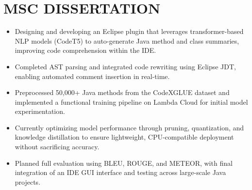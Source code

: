 \section{MSC DISSERTATION}
{
  {\begin{itemize}
    \item Designing and developing an Eclipse plugin that leverages transformer-based NLP models (CodeT5) to auto-generate Java method and class summaries, improving code comprehension within the IDE.
    \item Completed AST parsing and integrated code rewriting using Eclipse JDT, enabling automated comment insertion in real-time.
    \item Preprocessed 50,000+ Java methods from the CodeXGLUE dataset and implemented a functional training pipeline on Lambda Cloud for initial model experimentation.
    \item Currently optimizing model performance through pruning, quantization, and knowledge distillation to ensure lightweight, CPU-compatible deployment without sacrificing accuracy.
    \item Planned full evaluation using BLEU, ROUGE, and METEOR, with final integration of an IDE GUI interface and testing across large-scale Java projects.
  \end{itemize}
  }
}
